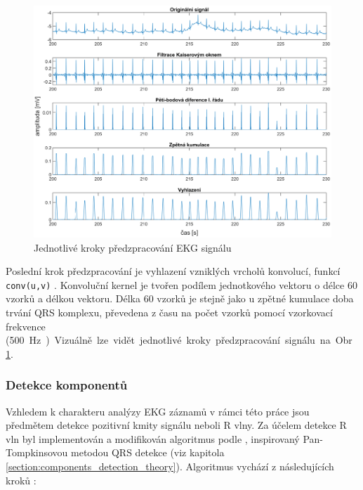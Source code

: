 \begin{figure}[h]
    \begin{center}
        \includegraphics[width=1\textwidth]{../assets/figures/preprocessing_steps}
        \caption{Jednotlivé kroky předzpracování EKG signálu}
        \label{fig:preprocessing_steps}
    \end{center}
\end{figure}

Poslední krok předzpracování je vyhlazení vzniklých vrcholů konvolucí, funkcí
\texttt{conv(u,v)} \cite{matlabCONV}. Konvoluční kernel je tvořen podílem
jednotkového vektoru o délce 60 vzorků a délkou vektoru. Délka 60 vzorků je
stejně jako u zpětné kumulace doba trvání QRS komplexu, převedena z času na
počet vzorků pomocí vzorkovací frekvence (500~\si\Hz). Vizuálně lze vidět
jednotlivé kroky předzpracování signálu na Obr. \ref{fig:preprocessing_steps}.

\subsubsection{Detekce komponentů}
\label{section:components_detection}
Vzhledem k charakteru analýzy EKG záznamů v rámci této práce jsou předmětem
detekce pozitivní kmity signálu neboli R vlny. Za účelem detekce R vln byl
implementován a modifikován algoritmus podle \cite{Nabian2018}, inspirovaný
Pan-Tompkinsovou metodou QRS detekce \cite{Pan1985} (viz kapitola
\ref{section:components_detection_theory}). Algoritmus vychází z následujících
kroků \cite{Nabian2018}:

